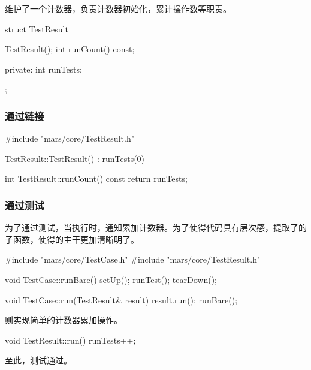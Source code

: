 \begin{content}
维护了一个计数器，负责计数器初始化，累计操作数等职责。

\begin{leftbar}
 \begin{c++}[caption={\ttfamily{include/mars/core/TestResult.h}}]
struct TestResult {
  TestResult();
  int runCount() const;

private:
  int runTests;
};
 \end{c++}
\end{leftbar}

\subsubsection{通过链接}

\begin{leftbar}
 \begin{c++}[caption={\ttfamily{src/mars/core/TestResult.cc}}]
#include "mars/core/TestResult.h"

TestResult::TestResult() : runTests(0) {
}

int TestResult::runCount() const {
  return runTests;
}
 \end{c++}
\end{leftbar}

\subsubsection{通过测试}

为了通过测试，当执行时，通知累加计数器。为了使得代码具有层次感，提取了的子函数，使得的主干更加清晰明了。

\begin{leftbar}
 \begin{c++}[caption={\ttfamily{src/mars/core/TestCase.cc}}]
#include "mars/core/TestCase.h"
#include "mars/core/TestResult.h"

void TestCase::runBare() {
  setUp();
  runTest();
  tearDown();
}

void TestCase::run(TestResult& result) {
  result.run();
  runBare();
}
 \end{c++}
\end{leftbar}

则实现简单的计数器累加操作。

\begin{leftbar}
 \begin{c++}[caption={\ttfamily{src/mars/core/TestResult.cc}}]
void TestResult::run() {
  runTests++;
}
 \end{c++}
\end{leftbar}

至此，测试通过。

\end{content}

